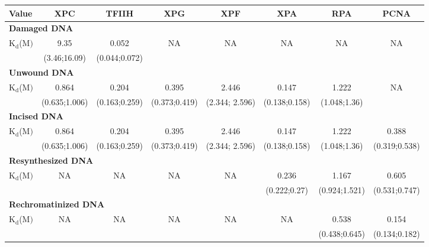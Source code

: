 \begin{landscape}
	\centering
\begin{table}[t]
	
	\small{
	\begin{tabular}[angle=90]{p{2cm}ccccccc}
	\hline
	\textbf{Value}    & \textbf{ XPC} & \textbf{TFIIH} & \textbf{XPG} & \textbf{XPF} & \textbf{XPA} & \textbf{RPA} & \textbf{PCNA}  \\
	\hline
	\multicolumn{8}{l}{\textbf{Damaged DNA}} \\
	$\text{K}_{\text{d}}$({\textmu}$\text{M})$                                                  & 9.35                & 0.052 & NA &NA&NA&NA&NA     \\
	& (3.46;16.09)     &(0.044;0.072)  &&&&&   \\
	\multicolumn{8}{l}{\textbf{Unwound DNA}} \\
	$\text{K}_{\text{d}}$({\textmu}$\text{M})$                                                  & 0.864                     & 0.204                   & 0.395                 &2.446                 &0.147                    &1.222                    &NA     \\
	& (0.635;1.006)     & (0.163;0.259)             & (0.373;0.419)		&(2.344; 2.596)&(0.138;0.158)     &  (1.048;1.36)  &   \\
	\multicolumn{8}{l}{\textbf{Incised DNA}} \\
	$\text{K}_{\text{d}}$({\textmu}$\text{M})$                                                  & 0.864                     & 0.204                   & 0.395                 &2.446                 &0.147                    &1.222                    &0.388     \\
	& (0.635;1.006)     & (0.163;0.259)             & (0.373;0.419)		&(2.344; 2.596)&(0.138;0.158)     &  (1.048;1.36) 	 & (0.319;0.538)  \\
	\multicolumn{8}{l}{\textbf{Resynthesized DNA}} \\
	$\text{K}_{\text{d}}$({\textmu}$\text{M})$                                                  & NA                          &NA                         & NA                      &NA                      &0.236                   &1.167                    &0.605     \\
	&                               &                              &                           &                          &(0.222;0.27)     &  (0.924;1.521)  & (0.531;0.747)  \\
	\multicolumn{8}{l}{\textbf{Rechromatinized DNA}} \\
	$\text{K}_{\text{d}}$({\textmu}$\text{M})$                                                  & NA                          &NA                         & NA                      &NA                      &NA                         &0.538                    &0.154     \\
	&                               &                              &                           &                          &                            &  (0.438;0.645)  & (0.134;0.182)  \\
	\hline
\end{tabular}}


\end{table}
\end{landscape}
